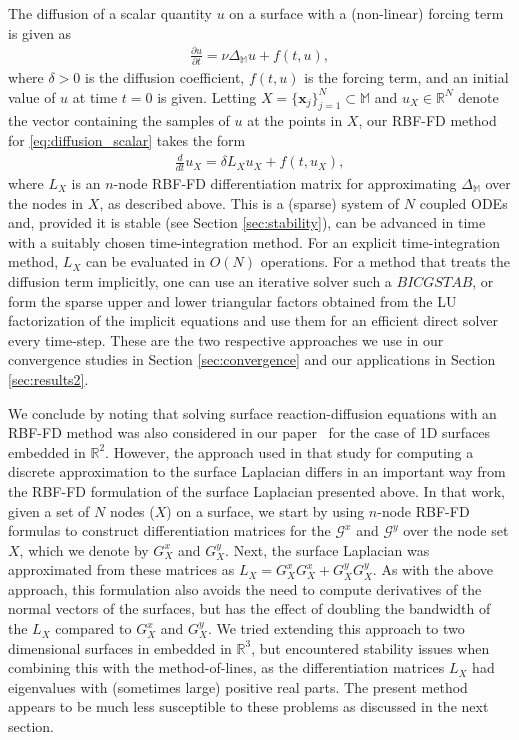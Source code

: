 \documentclass[smallextended]{svjour3}
\newcommand{\bicgstab}{{BICGSTAB}}
\def\calG{{ \mathcal G}}
\newcommand{\vX}{ \mathbf{x} }
\newcommand{\lp}{\left(}
\newcommand{\rp}{\right)}
\begin{document}
The diffusion of a scalar quantity $u$ on a surface with a (non-linear) forcing term is given as
\begin{align}
\frac{\partial u}{\partial t} = \nu \Delta_{\mathbb{M}} u + f(t,u),
\label{eq:diffusion_scalar}
\end{align}
where $\delta>0$ is the diffusion coefficient, $f(t,u)$ is the forcing term, and an initial value of $u$ at time $t=0$ is given.  Letting $X=\{\vX_j\}_{j=1}^N\subset\mathbb{M}$ and $u_X \in\mathbb{R}^N$ denote the vector containing the samples of $u$ at the points in $X$, our RBF-FD method for \eqref{eq:diffusion_scalar} takes the form
\begin{align}
\frac{d}{dt} u_X = \delta L_X u_X + f\lp t,u_X\rp,
\label{eq:kernel_mol}
\end{align}
where $L_X$ is an $n$-node RBF-FD differentiation matrix for approximating $\Delta_{\mathbb{M}}$ over the nodes in $X$, as described above.   This is a (sparse) system of $N$ coupled ODEs and, provided it is stable (see Section \ref{sec:stability}), can be advanced in time with a suitably chosen time-integration method.  For an explicit time-integration method, $L_X$ can be evaluated in $O(N)$ operations.  For a method that treats the diffusion term implicitly, one can use an iterative solver such a $\bicgstab$, or form the sparse upper and lower triangular factors obtained from the LU factorization of the implicit equations and use them for an efficient direct solver every time-step.  These are the two respective approaches we use in our convergence studies in Section \ref{sec:convergence} and our applications in Section \ref{sec:results2}.

We conclude by noting that solving surface reaction-diffusion equations with an RBF-FD method was also considered in our paper~\cite{ShankarWrightEtAlIJNMF2013} for the case of 1D surfaces embedded in $\mathbb{R}^2$.  However, the approach used in that study for computing a discrete approximation to the surface Laplacian differs in an important way from the RBF-FD formulation of the surface Laplacian presented above.  In that work, given a set of $N$ nodes ($X$) on a surface, we start by using $n$-node RBF-FD formulas to construct differentiation matrices for the $\calG^x$ and $\calG^y$ over the node set $X$, which we denote by $G^x_X$ and $G^y_X$.  Next, the surface Laplacian was approximated from these matrices as $L_X =  G^x_X G^x_X + G^y_X G^y_X$. As with the above approach, this formulation also avoids the need to compute derivatives of the normal vectors of the surfaces, but has the effect of doubling the bandwidth of the $L_X$ compared to $G^x_X$ and $G^y_X$.  We tried extending this approach to two dimensional surfaces in embedded in $\mathbb{R}^3$, but encountered stability issues when combining this with the method-of-lines, as the differentiation matrices $L_X$ had eigenvalues with (sometimes large) positive real parts. The present method appears to be much less susceptible to these problems as discussed in the next section.
\end{document}

